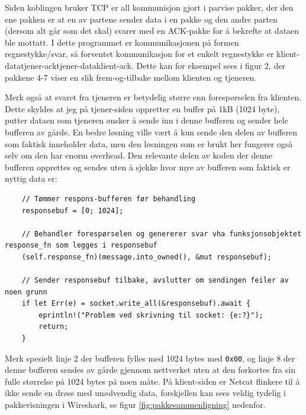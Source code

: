 \documentclass{article}
\begin{document}
Siden koblingen bruker TCP er all kommunisjon gjort i parvise pakker, der den ene pakken er at en av partene sender data i en pakke og den andre parten (dersom alt går som det skal) svarer med en ACK-pakke for å bekrefte at dataen ble mottatt. I dette programmet er kommunikasjonen på formen regnestykke/svar, så forventet kommunikasjon for et enkelt regnestykke er klient-data\rightarrow tjener-ack\rightarrow tjener-data\rightarrow klient-ack. Dette kan for eksempel sees i figur 2, der pakkene 4-7 viser en slik frem-og-tilbake mellom klienten og tjeneren.

Merk også at svaret fra tjeneren er betydelig større enn forespørselen fra klienten. Dette skyldes at jeg på tjener-siden oppretter en buffer på 1kB (1024 byte), putter dataen som tjeneren ønsker å sende inn i denne bufferen og sender hele bufferen av gårde. En bedre løsning ville vært å kun sende den delen av bufferen som faktisk inneholder data, men den løsningen som er brukt her fungerer også selv om den har enorm overhead.
Den relevante delen av koden der denne bufferen opprettes og sendes uten å sjekke hvor mye av bufferen som faktisk er nyttig data er:

\begin{lstlisting}
    // Tømmer respons-bufferen før behandling
    responsebuf = [0; 1024];
    
    // Behandler forespørselen og genererer svar vha funksjonsobjektet response_fn som legges i responsebuf
    (self.response_fn)(message.into_owned(), &mut responsebuf);
    
    // Sender responsebuf tilbake, avslutter om sendingen feiler av noen grunn
    if let Err(e) = socket.write_all(&responsebuf).await {
        eprintln!("Problem ved skrivning til socket: {e:?}");
        return;
    }
\end{lstlisting}

Merk spesielt linje 2 der bufferen fylles med 1024 bytes med \texttt{0x00}, og linje 8 der denne bufferen sendes av gårde gjennom nettverket uten at den forkortes fra sin fulle størrelse på 1024 bytes på noen måte. På klient-siden er Netcat flinkere til å ikke sende en drøss med unødvendig data, forskjellen kan sees veldig tydelig i pakkevisningen i Wireshark, se figur \ref{fig:pakkesammenligning} nedenfor.
\end{document}
